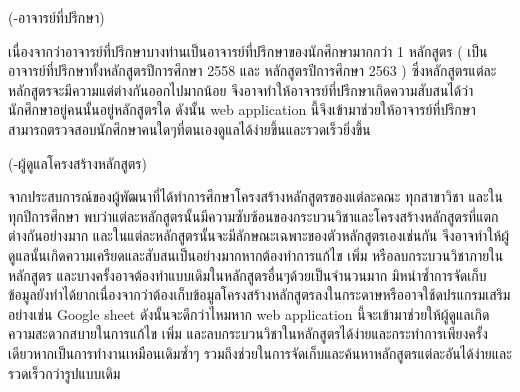 {(-อาจารย์ที่ปรึกษา)}

{เนื่องจากว่าอาจารย์ที่ปรึกษาบางท่านเป็นอาจารย์ที่ปรึกษาของนักศึกษามากกว่า 1 หลักสูตร ( เป็นอาจารย์ที่ปรึกษาทั้งหลักสูตรปีการศึกษา 2558 และ หลักสูตรปีการศึกษา 2563 ) ซึ่งหลักสูตรแต่ละหลักสูตรจะมีความแต่ต่างกันออกไปมากน้อย จึงอาจทำให้อาจารย์ที่ปรึกษาเกิดความสับสนได้ว่านักศึกษาอยู่คนนั้นอยู่หลักสูตรใด ดังนั้น web application นี้จึงเข้ามาช่วยให้อาจารย์ที่ปรึกษาสามารถตรวจสอบนักศึกษาคนใดๆที่ตนเองดูแลได้ง่ายขึ้นและรวดเร็วยิ่งขึ้น
 }	

{(-ผู้ดูแลโครงสร้างหลักสูตร)}

{จากประสบการณ์ของผู้พัฒนาที่ได้ทำการศึกษาโครงสร้างหลักสูตรของแต่ละคณะ ทุกสาขาวิชา และในทุกปีการศึกษา พบว่าแต่ละหลักสูตรนั้นมีความซับซ้อนของกระบวนวิชาและโครงสร้างหลักสูตรที่แตกต่างกันอย่างมาก และในแต่ละหลักสูตรนั้นจะมีลักษณะเฉพาะของตัวหลักสูตรเองเช่นกัน จึงอาจทำให้ผู้ดูแลนั้นเกิดความเครียดและสับสนเป็นอย่างมากหากต้องทำการแก้ไข เพิ่ม หรือลบกระบวนวิชาภายในหลักสูตร และบางครั้งอาจต้องทำแบบเดิมในหลักสูตรอื่นๆด้วยเป็นจำนวนมาก มิหนำซ้ำการจัดเก็บข้อมูลยังทำได้ยากเนื่องจากว่าต้องเก็บข้อมูลโครงสร้างหลักสูตรลงในกระดาษหรืออาจใช้ดปรแกรมเสริมอย่างเช่น Google sheet ดังนั้นจะดีกว่าไหมหาก web application นี้จะเข้ามาช่วยให้ผู้ดูแลเกิดความสะดวกสบายในการแก้ไข เพิ่ม และลบกระบวนวิชาในหลักสูตรได้ง่ายและกระทำการเพียงครั้งเดียวหากเป็นการทำงานเหมือนเดิมซ้ำๆ รวมถึงช่วยในการจัดเก็บและค้นหาหลักสูตรแต่ละอันได้ง่ายและรวดเร็วกว่ารูปแบบเดิม   
}
		



